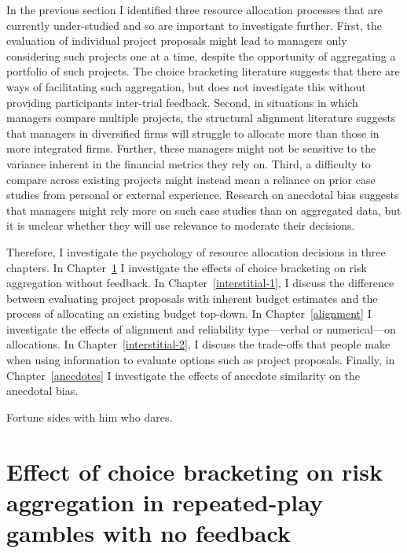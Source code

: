 \documentclass[a4paper, nobind, dvipsnames]{templates/ociamthesis}
\theoremstyle{definition}
\theoremstyle{definition}
\theoremstyle{definition}
\theoremstyle{definition}
\theoremstyle{remark}
\begin{document}
In the previous section I identified three resource allocation processes that
are currently under-studied and so are important to investigate further. First,
the evaluation of individual project proposals might lead to managers only
considering such projects one at a time, despite the opportunity of aggregating
a portfolio of such projects. The choice bracketing literature suggests that
there are ways of facilitating such aggregation, but does not investigate this
without providing participants inter-trial feedback. Second, in situations in
which managers compare multiple projects, the structural alignment literature
suggests that managers in diversified firms will struggle to allocate more than
those in more integrated firms. Further, these managers might not be sensitive
to the variance inherent in the financial metrics they rely on. Third, a
difficulty to compare across existing projects might instead mean a reliance on
prior case studies from personal or external experience. Research on anecdotal
bias suggests that managers might rely more on such case studies than on
aggregated data, but it is unclear whether they will use relevance to moderate
their decisions.

Therefore, I investigate the psychology of resource allocation decisions in
three chapters. In Chapter~\ref{aggregation} I investigate the effects of
choice bracketing on risk aggregation without feedback. In
Chapter~\ref{interstitial-1}, I discuss the difference between evaluating
project proposals with inherent budget estimates and the process of allocating
an existing budget top-down. In Chapter~\ref{alignment} I investigate the
effects of alignment and reliability type---verbal or numerical---on
allocations. In Chapter~\ref{interstitial-2}, I discuss the
trade-offs that people make when using information to evaluate options such as
project proposals. Finally, in Chapter~\ref{anecdotes} I investigate the effects
of anecdote similarity on the anecdotal bias.

\newpage

\printbibliography[segment=\therefsegment,heading=subbibintoc]



\begin{savequote}
Fortune sides with him who dares.
\end{savequote}

\hypertarget{aggregation}{%
\chapter{Effect of choice bracketing on risk aggregation in repeated-play gambles with no feedback}\label{aggregation}}
\end{document}
